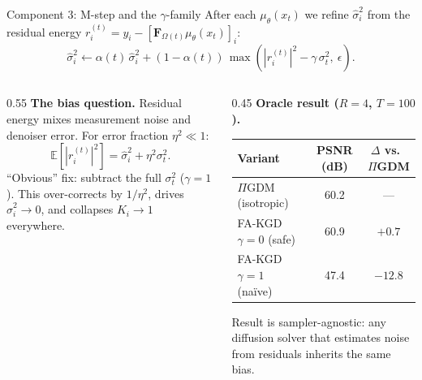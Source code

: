 \documentclass[aspectratio=169]{beamer}
\newcommand{\PIGDM}{$\Pi$GDM}
\newcommand{\FAKGD}{FA-KGD}
\newcommand{\hatsig}{\hat{\sigma}}
\newcommand{\muth}{\mu_\theta}
\begin{document}
\begin{frame}{Component 3: M-step and the $\gamma$-family}
  \small
  After each $\muth(x_t)$ we refine $\hatsig_i^2$ from the residual energy
  $r_i^{(t)} = y_i - [\mathbf{F}_{\Omega(t)}\muth(x_t)]_i$:
  \[
    \hatsig_i^2 \leftarrow \alpha(t)\,\hatsig_i^2 + (1-\alpha(t))\,\max\!\left(|r_i^{(t)}|^2 - \gamma\,\sigma_t^2,\ \epsilon\right).
  \]
  \begin{columns}[T]
    \begin{column}{0.55\textwidth}
      \textbf{The bias question.} Residual energy mixes measurement noise and denoiser error. For error fraction $\eta^2 \ll 1$:
      \[
        \mathbb{E}\!\left[|r_i^{(t)}|^2\right] = \hatsig_i^2 + \eta^2 \sigma_t^2.
      \]
      ``Obvious'' fix: subtract the full $\sigma_t^2$ ($\gamma=1$). This over-corrects by $1/\eta^2$, drives $\hatsig_i^2 \to 0$, and collapses $K_i \to 1$ everywhere.
    \end{column}
    \begin{column}{0.45\textwidth}
      \textbf{Oracle result ($R{=}4$, $T{=}100$).}
      \begin{center}
      \scriptsize
      \begin{tabular}{@{}l c c@{}}
        \toprule
        Variant & PSNR (dB) & $\Delta$ vs.\ \PIGDM{} \\
        \midrule
        \PIGDM{} (isotropic) & 60.2 & --- \\
        \FAKGD{} $\gamma{=}0$ (safe) & 60.9 & $+0.7$ \\
        \FAKGD{} $\gamma{=}1$ (na\"ive) & 47.4 & $\mathbf{-12.8}$ \\
        \bottomrule
      \end{tabular}
      \end{center}
      \vspace{0.3em}
      \footnotesize
      Result is sampler-agnostic: any diffusion solver that estimates noise from residuals inherits the same bias.
    \end{column}
  \end{columns}
\end{frame}
\end{document}
